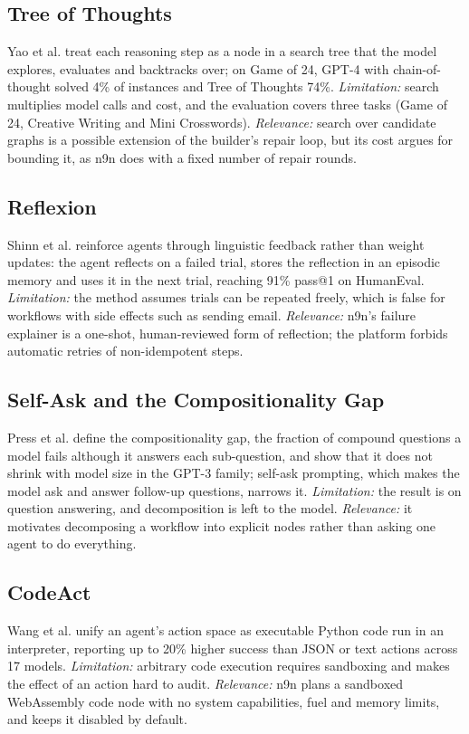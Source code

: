 \documentclass[conference]{IEEEtran}
\begin{document}
\subsection{Tree of Thoughts}
Yao et al. \cite{yao2023tot} treat each reasoning step as a node in a search tree that the model explores, evaluates and backtracks over; on Game of 24, GPT-4 with chain-of-thought solved 4\% of instances and Tree of Thoughts 74\%. \emph{Limitation:} search multiplies model calls and cost, and the evaluation covers three tasks (Game of 24, Creative Writing and Mini Crosswords). \emph{Relevance:} search over candidate graphs is a possible extension of the builder's repair loop, but its cost argues for bounding it, as n9n does with a fixed number of repair rounds.

\subsection{Reflexion}
Shinn et al. \cite{shinn2023reflexion} reinforce agents through linguistic feedback rather than weight updates: the agent reflects on a failed trial, stores the reflection in an episodic memory and uses it in the next trial, reaching 91\% pass@1 on HumanEval. \emph{Limitation:} the method assumes trials can be repeated freely, which is false for workflows with side effects such as sending email. \emph{Relevance:} n9n's failure explainer is a one-shot, human-reviewed form of reflection; the platform forbids automatic retries of non-idempotent steps.

\subsection{Self-Ask and the Compositionality Gap}
Press et al. \cite{press2023selfask} define the compositionality gap, the fraction of compound questions a model fails although it answers each sub-question, and show that it does not shrink with model size in the GPT-3 family; self-ask prompting, which makes the model ask and answer follow-up questions, narrows it. \emph{Limitation:} the result is on question answering, and decomposition is left to the model. \emph{Relevance:} it motivates decomposing a workflow into explicit nodes rather than asking one agent to do everything.

\subsection{CodeAct}
Wang et al. \cite{wang2024codeact} unify an agent's action space as executable Python code run in an interpreter, reporting up to 20\% higher success than JSON or text actions across 17 models. \emph{Limitation:} arbitrary code execution requires sandboxing and makes the effect of an action hard to audit. \emph{Relevance:} n9n plans a sandboxed WebAssembly code node with no system capabilities, fuel and memory limits, and keeps it disabled by default.
\end{document}
